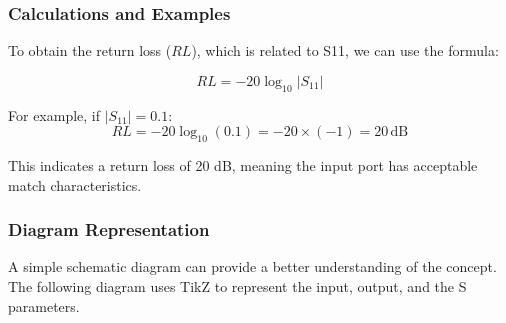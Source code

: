 \subsubsection*{Calculations and Examples}

To obtain the return loss (\( RL \)), which is related to S11, we can use the formula:

\[
RL = -20 \log_{10} |S_{11}|
\]

For example, if \( |S_{11}| = 0.1 \):
\[
RL = -20 \log_{10}(0.1) = -20 \times (-1) = 20 \, \text{dB}
\]

This indicates a return loss of 20 dB, meaning the input port has acceptable match characteristics.

\subsubsection*{Diagram Representation}

A simple schematic diagram can provide a better understanding of the concept. The following diagram uses TikZ to represent the input, output, and the S parameters.

\begin{center}
\end{center}
